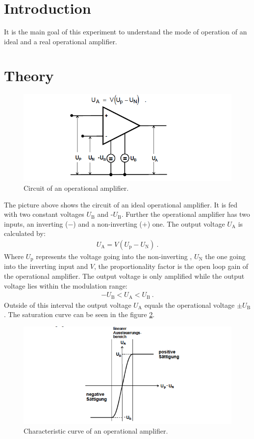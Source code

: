 \section{Introduction}
It is the main goal of this experiment to understand the mode of operation of an
ideal and a real operational amplifier.

\section{Theory}
\FloatBarrier
\begin{figure}
  \centering
  \includegraphics[scale=0.5]{opamp.PNG}
  \caption{Circuit of an operational amplifier. \cite{Q1}}
  \label{abb1}
\end{figure}
\FloatBarrier
The picture above shows the circuit of an ideal operational amplifier. It is
fed with two constant voltages $U_{\text{B}}$ and -$U_{\text{B}}$.
Further the operational amplifier has two inputs, an inverting ($-$) and a
non-inverting ($+$) one. The output voltage $U_{\text{A}}$ is calculated by:
\begin{align}
    U_{\text{A}} = V(U_{\text{p}}-U_{\text{N}}) \ .
    \label{eq:outputvoltage}
\end{align}
Where $U_{\text{p}}$ represents the voltage going into the non-inverting ,
$U_{\text{N}}$ the one going into the inverting input and $V$, the proportionality
factor is the open loop gain of the operational amplifier.
The output voltage is only amplified while the output voltage lies within the
modulation range:
\begin{align*}
    -U_{\text{B}} < U_{\text{A}} < U_{\text{B}} \ .
\end{align*}
Outside of this interval the output voltage $U_{\text{A}}$ equals the operational
voltage $\pm U_{\text{B}}$. The saturation curve can be seen in the figure \ref{abb2}.
\FloatBarrier
\begin{figure}
  \centering
  \includegraphics[scale=0.5]{saturation.PNG}
  \caption{Characteristic curve of an operational amplifier. \cite{Q1}}
  \label{abb2}
\end{figure}
